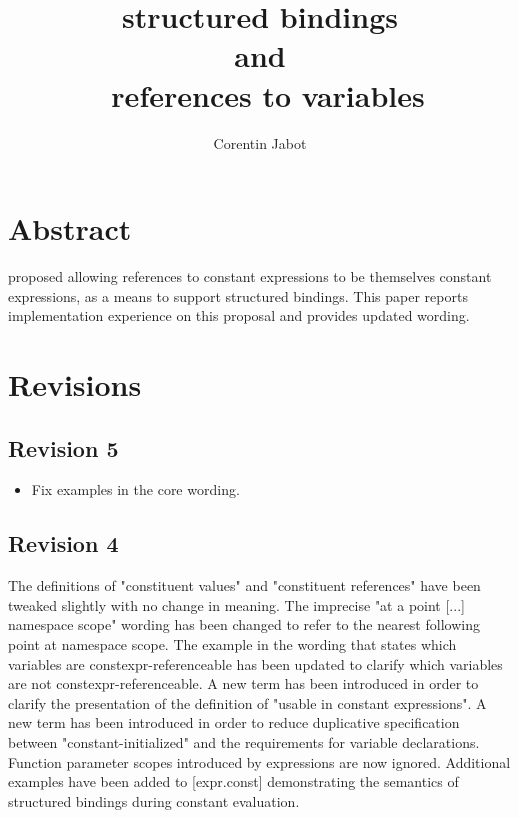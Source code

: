 \documentclass{wg21}
\title{\tcode{constexpr} structured bindings\\{\small and}\\\ references to \tcode{constexpr} variables}
\author{Corentin Jabot}{corentin.jabot@gmail.com}
\begin{document}
\maketitle

\section{Abstract}

 proposed allowing references to constant expressions to be themselves constant expressions,
as a means to support  structured bindings.
This paper reports implementation experience on this proposal and provides updated wording.


\section{Revisions}


\subsection{Revision 5}

\begin{itemize}
\item Fix examples in the core wording.
\end{itemize}

\subsection{Revision 4}

The definitions of "constituent values" and "constituent references" have been
tweaked slightly with no change in meaning.  The imprecise "at a point [...]
namespace scope" wording has been changed to refer to the nearest following
point at namespace scope.  The example in the wording that states which
variables are constexpr-referenceable has been updated to clarify which
variables are not constexpr-referenceable.  A new term has been introduced in
order to clarify the presentation of the definition of "usable in constant
expressions".  A new term has been introduced in order to reduce duplicative
specification between "constant-initialized" and the requirements for
 variable declarations.  Function parameter scopes introduced
by  expressions are now ignored.  Additional examples have been
added to [expr.const] demonstrating the semantics of structured bindings during
constant evaluation.
\end{document}
